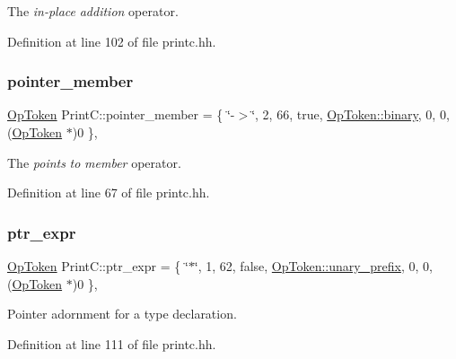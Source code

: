 The {\itshape in-\/place} {\itshape addition} operator. 



Definition at line 102 of file printc.\+hh.

\mbox{\label{class_print_c_aaafaaab6d0d2d93fde816c824be3d432}} 
\subsubsection{\texorpdfstring{pointer\_member}{pointer\_member}}
{\footnotesize\ttfamily \mbox{\hyperlink{class_op_token}{Op\+Token}} Print\+C\+::pointer\+\_\+member = \{ \char`\"{}-\/$>$\char`\"{}, 2, 66, true, \mbox{\hyperlink{class_op_token_af41c7f108d5662ede7765c5a6c44eaffa3a2ec63522a9329a71ddbe8adc3e752d}{Op\+Token\+::binary}}, 0, 0, (\mbox{\hyperlink{class_op_token}{Op\+Token}} $\ast$)0 \}\hspace{0.3cm}{\ttfamily [static]}, {\ttfamily [protected]}}



The {\itshape points} {\itshape to} {\itshape member} operator. 



Definition at line 67 of file printc.\+hh.

\mbox{\label{class_print_c_a569fcb3559048223bde66129130376a5}} 
\subsubsection{\texorpdfstring{ptr\_expr}{ptr\_expr}}
{\footnotesize\ttfamily \mbox{\hyperlink{class_op_token}{Op\+Token}} Print\+C\+::ptr\+\_\+expr = \{ \char`\"{}$\ast$\char`\"{}, 1, 62, false, \mbox{\hyperlink{class_op_token_af41c7f108d5662ede7765c5a6c44eaffa0d809c13f66611247b81856fc9e68289}{Op\+Token\+::unary\+\_\+prefix}}, 0, 0, (\mbox{\hyperlink{class_op_token}{Op\+Token}} $\ast$)0 \}\hspace{0.3cm}{\ttfamily [static]}, {\ttfamily [protected]}}



Pointer adornment for a type declaration. 



Definition at line 111 of file printc.\+hh.

